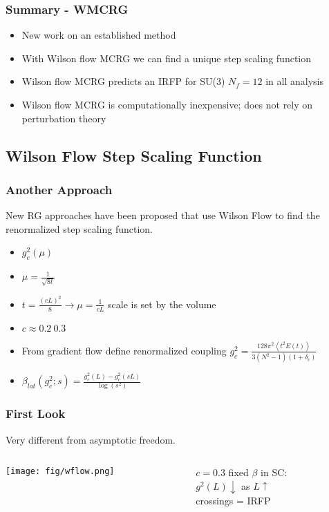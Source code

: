 \begin{frame}
  \frametitle{Summary - WMCRG}
  \begin{itemize}
    \item New work on an established method
    \item With Wilson flow MCRG we can find a unique step scaling function
    \item Wilson flow MCRG predicts an IRFP for SU(3) $N_f=12$ in all analysis
    \item Wilson flow MCRG is computationally inexpensive; does not rely on perturbation theory
  \end{itemize}
\end{frame}

\subsection{Wilson Flow Step Scaling Function}
\addtocounter{framenumber}{-1}

\begin{frame}
  \frametitle{Another Approach}
  New RG approaches have been proposed that use Wilson Flow to find the renormalized step scaling function.
  \begin{itemize}
    \item $g_c^2(\mu)$
    \item $\mu = \frac{1}{\sqrt{8t}}$
    \item $t = \frac{(cL)^2}{8} \rightarrow \mu = \frac{1}{cL}$ scale is set by the volume
    \item $c\approx 0.2~0.3$
    \item From gradient flow define renormalized coupling $g_c^2=\frac{128\pi^2\left<t^2E(t)\right>}{3(N^2-1)(1+\delta_c)}$
    \item $\beta_{lat}(g^2_c; s) = \frac{g^2_c(L) - g^2_c(sL)}{\log(s^2)}$
  \end{itemize}
\end{frame}

\begin{frame}
  \frametitle{First Look}
  Very different from asymptotic freedom.
  \begin{columns}
    \begin{column}{0.65\textwidth}
      \texttt{[image: fig/wflow.png]}
    \end{column}
    \begin{column}{0.35\textwidth}
      \begin{center}
        $c=0.3$
        \vspace{24pt}
        fixed $\beta$ in SC:\\
        $g^2(L) \downarrow$ as $L \uparrow$\\
        \vspace{24pt}
        crossings = IRFP
      \end{center}
    \end{column}
  \end{columns}
\end{frame}

